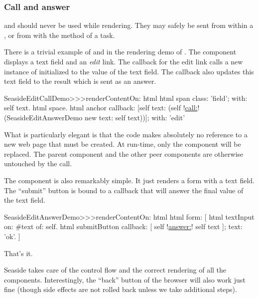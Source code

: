 \documentclass[a4paper,10pt,twoside]{book}
\begin{document}
\subsubsection{Call and answer}

 and  should never be used while rendering.
They may safely be sent from within a , or from with the  method of a task.

There is a trivial example of  and  in the rendering demo of .
The component  displays a text field and an \emph{edit} link.
The callback for the edit link calls a new instance of  initialized to the value of the text field.
The callback also updates this text field to the result which is sent as an answer.

\begin{code}{}
SeasideEditCallDemo>>>renderContentOn: html 
	html span
		class: 'field';
		with: self text.
	html space.
	html anchor
		callback: [self text: (self !\underline{call:}! (SeasideEditAnswerDemo new text: self text))];
		with: 'edit'
\end{code}{}

What is particularly elegant is that the code makes absolutely no reference to a new web page that must be created.
At run-time, only the  component will be replaced.
The parent component and the other peer components are otherwise untouched by the call.

The  component is also remarkably simple.
It just renders a form with a text field.
The ``submit'' button is bound to a callback that will answer the final value of the text field.

\begin{code}{}
SeasideEditAnswerDemo>>>renderContentOn: html
	html form: [
		html textInput
			on: #text of: self.
		html submitButton
			callback: [ self !\underline{answer:}! self text ];
			text: 'ok'.
		]
\end{code}{}

That's it.

Seaside takes care of the control flow and the correct rendering of all the components.
Interestingly, the ``back'' button of the browser will also work just fine (though side effects are not rolled back unless we take additional steps).
\end{document}
